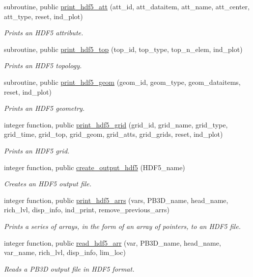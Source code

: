 \begin{DoxyCompactItemize}
subroutine, public \hyperlink{namespacehdf5__ops_a4d0ba813f369f904a9e991804662d099}{print\+\_\+hdf5\+\_\+att} (att\+\_\+id, att\+\_\+dataitem, att\+\_\+name, att\+\_\+center, att\+\_\+type, reset, ind\+\_\+plot)
\begin{DoxyCompactList}\small\item\em Prints an H\+D\+F5 attribute. \end{DoxyCompactList}\item 
subroutine, public \hyperlink{namespacehdf5__ops_af34b4aea64a8b67ec827aaf4a7425caf}{print\+\_\+hdf5\+\_\+top} (top\+\_\+id, top\+\_\+type, top\+\_\+n\+\_\+elem, ind\+\_\+plot)
\begin{DoxyCompactList}\small\item\em Prints an H\+D\+F5 topology. \end{DoxyCompactList}\item 
subroutine, public \hyperlink{namespacehdf5__ops_ac23a71e7029f46e5f38a95468fc10e22}{print\+\_\+hdf5\+\_\+geom} (geom\+\_\+id, geom\+\_\+type, geom\+\_\+dataitems, reset, ind\+\_\+plot)
\begin{DoxyCompactList}\small\item\em Prints an H\+D\+F5 geometry. \end{DoxyCompactList}\item 
integer function, public \hyperlink{namespacehdf5__ops_a144d595445778d89ec1a1bc0b12a94fb}{print\+\_\+hdf5\+\_\+grid} (grid\+\_\+id, grid\+\_\+name, grid\+\_\+type, grid\+\_\+time, grid\+\_\+top, grid\+\_\+geom, grid\+\_\+atts, grid\+\_\+grids, reset, ind\+\_\+plot)
\begin{DoxyCompactList}\small\item\em Prints an H\+D\+F5 grid. \end{DoxyCompactList}\item 
integer function, public \hyperlink{namespacehdf5__ops_a1263636fffc4f4aa86f72bd5fd3352a0}{create\+\_\+output\+\_\+hdf5} (H\+D\+F5\+\_\+name)
\begin{DoxyCompactList}\small\item\em Creates an H\+D\+F5 output file. \end{DoxyCompactList}\item 
integer function, public \hyperlink{namespacehdf5__ops_af80b879ed614698ed91b8235cf1cb22a}{print\+\_\+hdf5\+\_\+arrs} (vars, P\+B3\+D\+\_\+name, head\+\_\+name, rich\+\_\+lvl, disp\+\_\+info, ind\+\_\+print, remove\+\_\+previous\+\_\+arrs)
\begin{DoxyCompactList}\small\item\em Prints a series of arrays, in the form of an array of pointers, to an H\+D\+F5 file. \end{DoxyCompactList}\item 
integer function, public \hyperlink{namespacehdf5__ops_a5108e0d6f6b492cb981505ebceedd9ee}{read\+\_\+hdf5\+\_\+arr} (var, P\+B3\+D\+\_\+name, head\+\_\+name, var\+\_\+name, rich\+\_\+lvl, disp\+\_\+info, lim\+\_\+loc)
\begin{DoxyCompactList}\small\item\em Reads a P\+B3D output file in H\+D\+F5 format. \end{DoxyCompactList}\end{DoxyCompactItemize}
